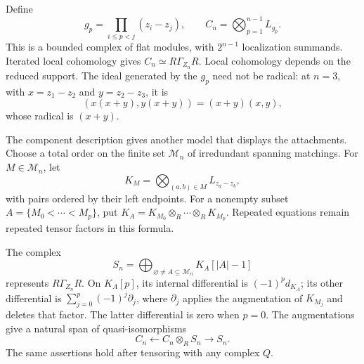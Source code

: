 Define
\begin{equation}\label{v4-eq:word-cut-cech}
 g_p=\prod_{i\le p<j}(z_i-z_j),\qquad
 C_n=\bigotimes_{p=1}^{n-1}L_{g_p}.
\end{equation}
This is a bounded complex of flat modules, with \(2^{n-1}\)
localization summands. Iterated local cohomology gives
\(C_n\simeq R\Gamma_{Z_n}R\). Local cohomology depends on the
reduced support. The ideal generated by the \(g_p\) need not be
radical: at \(n=3\), with \(x=z_1-z_2\) and \(y=z_2-z_3\), it is
\[
 (x(x+y),y(x+y))=(x+y)(x,y),
\]
whose radical is \((x+y)\).

The component description gives another model that displays the
attachments. Choose a total order on the finite set \(\mathcal M_n\)
of irredundant spanning matchings. For \(M\in\mathcal M_n\), let
\[
 K_M=\bigotimes_{(a,b)\in M}L_{z_a-z_b},
\]
with pairs ordered by their left endpoints. For a nonempty subset
\(A=\{M_0<\cdots<M_p\}\), put
\(K_A=K_{M_0}\otimes_R\cdots\otimes_RK_{M_p}\).
Repeated equations remain repeated tensor factors in this formula.

\begin{proposition}
\label{v4-prop:word-component-complex}
The complex
\begin{equation}\label{v4-eq:word-component-complex}
 S_n=\bigoplus_{\varnothing\ne A\subseteq\mathcal M_n}
                           K_A[|A|-1]
\end{equation}
represents \(R\Gamma_{Z_n}R\). On \(K_A[p]\), its internal
differential is \((-1)^p d_{K_A}\); its other differential is
\(\sum_{j=0}^p(-1)^j\partial_j\), where \(\partial_j\)
applies the augmentation of \(K_{M_j}\) and deletes that factor.
The latter differential is zero when \(p=0\). The augmentations
give a natural span of quasi-isomorphisms
\begin{equation}\label{v4-eq:word-support-roof}
 C_n\longleftarrow C_n\otimes_R S_n\longrightarrow S_n.
\end{equation}
The same assertions hold after tensoring with any complex \(Q\).
\end{proposition}

